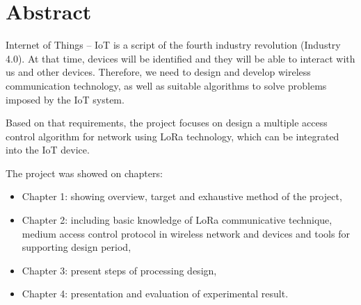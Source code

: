 \thispagestyle{plain}
\chapter*{Abstract}
Internet of Things – IoT is a script of the fourth industry revolution (Industry 4.0). At that time, devices will be identified and they will be able to interact with us and other devices. Therefore, we need to design and develop wireless communication technology, as well as suitable algorithms to solve problems imposed by the IoT system.
\par
Based on that requirements, the project focuses on design a multiple access control algorithm for network using LoRa technology, which can be integrated into the IoT device.
\par
The project was showed on chapters:
\begin{itemize}
\item   Chapter 1: showing overview, target and exhaustive method of the project,
\item   Chapter 2: including basic knowledge of LoRa communicative technique, medium access control protocol in wireless network and devices and tools for supporting design period,
\item	Chapter 3: present steps of processing design,
\item	Chapter 4: presentation and evaluation of experimental result.
\end{itemize}

